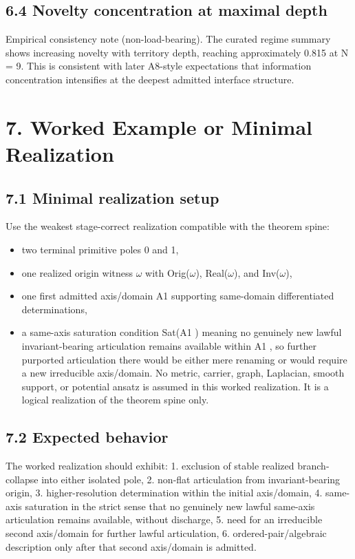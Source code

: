\documentclass[11pt]{article}
\begin{document}
\subsection{6.4 Novelty concentration at maximal depth}\label{novelty-concentration-at-maximal-depth}

Empirical consistency note (non-load-bearing). The curated regime summary shows increasing novelty with territory depth, reaching approximately 0.815 at N = 9. This is consistent with later A8-style expectations that information concentration intensifies at the deepest admitted interface structure.

\section{7. Worked Example or Minimal Realization}\label{worked-example-or-minimal-realization}

\subsection{7.1 Minimal realization setup}\label{minimal-realization-setup}

Use the weakest stage-correct realization compatible with the theorem spine:

\begin{itemize}
\item
  two terminal primitive poles 0 and 1,
\item
  one realized origin witness $\omega$ with Orig($\omega$), Real($\omega$), and Inv($\omega$),
\item
  one first admitted axis/domain A1 supporting same-domain differentiated determinations,
\item
  a same-axis saturation condition Sat(A1 ) meaning no genuinely new lawful invariant-bearing articulation remains available within A1 , so further purported articulation there would be either mere renaming or would require a new irreducible axis/domain. No metric, carrier, graph, Laplacian, smooth support, or potential ansatz is assumed in this worked realization. It is a logical realization of the theorem spine only.
\end{itemize}

\subsection{7.2 Expected behavior}\label{expected-behavior}

The worked realization should exhibit: 1. exclusion of stable realized branch-collapse into either isolated pole, 2. non-flat articulation from invariant-bearing origin, 3. higher-resolution determination within the initial axis/domain, 4. same-axis saturation in the strict sense that no genuinely new lawful same-axis articulation remains available, without discharge, 5. need for an irreducible second axis/domain for further lawful articulation, 6. ordered-pair/algebraic description only after that second axis/domain is admitted.
\end{document}
